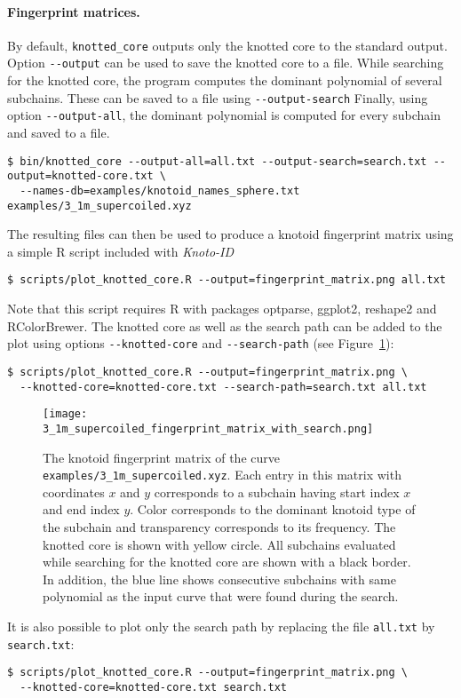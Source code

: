 \paragraph{Fingerprint matrices.}
By default, \lstinline{knotted_core} outputs only the knotted core to the standard output. Option \lstinline{--output} can be used to save the knotted core to a file.
While searching for the knotted core, the program computes the dominant polynomial of several subchains. These can be saved to a file using  \lstinline{--output-search}
Finally, using option \lstinline{--output-all}, the dominant polynomial is computed for every subchain and saved to a file. 
\begin{lstlisting}
$ bin/knotted_core --output-all=all.txt --output-search=search.txt --output=knotted-core.txt \
  --names-db=examples/knotoid_names_sphere.txt examples/3_1m_supercoiled.xyz
\end{lstlisting}
The resulting files can then be used to produce a knotoid fingerprint matrix\cite{yeates, sulkowska2012, gound} using a simple {\ttfamily R} script\cite{r2017} included with {\it Knoto-ID} 
\begin{lstlisting}
$ scripts/plot_knotted_core.R --output=fingerprint_matrix.png all.txt
\end{lstlisting}
Note that this script requires {\ttfamily R}\cite{r2017} with packages {\ttfamily optparse}\cite{optparse}, {\ttfamily ggplot2}\cite{wickham2009}, {\ttfamily reshape2}\cite{reshape2} and {\ttfamily RColorBrewer}\cite{rcolorbrewer}.
The knotted core as well as the search path can be added to the plot using options \lstinline{--knotted-core} and \lstinline{--search-path} (see Figure~\ref{fig:3_1m_supercoiled:fingerprint:search}):
\begin{lstlisting}
$ scripts/plot_knotted_core.R --output=fingerprint_matrix.png \
  --knotted-core=knotted-core.txt --search-path=search.txt all.txt
\end{lstlisting}
\begin{figure}[t]
\centering
\texttt{[image: 3\_1m\_supercoiled\_fingerprint\_matrix\_with\_search.png]}
\caption{ The knotoid fingerprint matrix of the curve \lstinline{examples/3_1m_supercoiled.xyz}. Each entry in this matrix with coordinates $x$ and $y$ corresponds to a subchain having start index $x$ and end index $y$. Color corresponds to the dominant knotoid type of the subchain and transparency corresponds to its frequency. The knotted core is shown with yellow circle. All subchains evaluated while searching for the knotted core are shown with a black border. In addition, the blue line shows consecutive subchains with same polynomial as the input curve that were found during the search.}\label{fig:3_1m_supercoiled:fingerprint:search}
\end{figure}
It is also possible to plot only the search path by replacing the file \lstinline{all.txt} by \lstinline{search.txt}:
\begin{lstlisting}
$ scripts/plot_knotted_core.R --output=fingerprint_matrix.png \
  --knotted-core=knotted-core.txt search.txt
\end{lstlisting}

